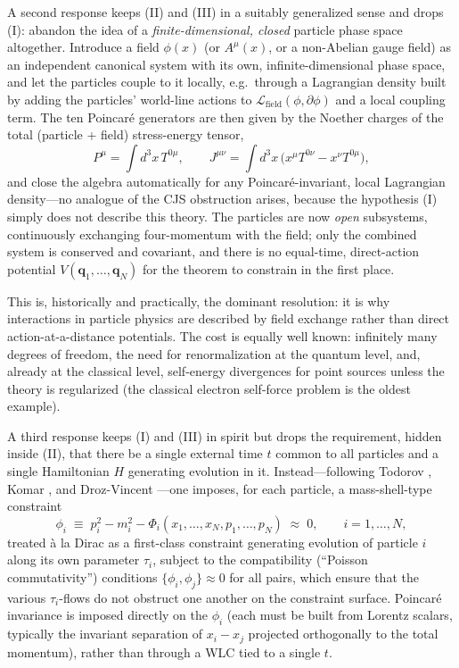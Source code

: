 A second response keeps (II) and (III) in a suitably generalized sense and
drops (I): abandon the idea of a \emph{finite-dimensional, closed} particle
phase space altogether. Introduce a field $\phi(x)$ (or $A^\mu(x)$, or a
non-Abelian gauge field) as an independent canonical system with its own,
infinite-dimensional phase space, and let the particles couple to it locally,
e.g.\ through a Lagrangian density built by adding the particles' world-line
actions to $\mathcal L_{\text{field}}(\phi,\partial\phi)$ and a local coupling
term. The ten Poincar\'e generators are then given by the Noether charges of
the total (particle + field) stress-energy tensor,
\begin{equation}
P^\mu=\int d^3x\, T^{0\mu}, \qquad J^{\mu\nu}=
    \int d^3x\,\big(x^\mu T^{0\nu}-x^\nu T^{0\mu}\big),
\end{equation}
and close the algebra automatically for any Poincar\'e-invariant, local
Lagrangian density---no analogue of the CJS obstruction arises, because the
hypothesis (I) simply does not describe this theory. The particles are now
\emph{open} subsystems, continuously exchanging four-momentum with the field;
only the combined system is conserved and covariant, and there is no
equal-time, direct-action potential $V({\bm q}_1,\dots,{\bm q}_N)$ for the
theorem to constrain in the first place.

This is, historically and practically, the dominant resolution: it is why
interactions in particle physics are described by field exchange rather than
direct action-at-a-distance potentials. The cost is equally well known:
infinitely many degrees of freedom, the need for renormalization at the quantum
level, and, already at the classical level, self-energy divergences for point
sources unless the theory is regularized (the classical electron self-force
problem is the oldest example).

A third response keeps (I) and (III) in spirit but drops the requirement,
hidden inside (II), that there be a single external time $t$ common to all
particles and a single Hamiltonian $H$ generating evolution in it.
Instead---following Todorov , Komar , and Droz-Vincent ---one imposes, for each
particle, a mass-shell-type constraint
\begin{equation}
\phi_i \;\equiv\; p_i^2 - m_i^2 - \Phi_i(x_1,\dots,x_N,p_1,\dots,p_N) \;\approx\;
    0, \qquad i=1,\dots,N,
\label{eq:constraint}
\end{equation}
treated \`a la Dirac as a first-class constraint generating evolution of
particle $i$ along its own parameter $\tau_i$, subject to the compatibility
(``Poisson commutativity'') conditions $\{\phi_i,\phi_j\}\approx 0$ for all
pairs, which ensure that the various $\tau_i$-flows do not obstruct one another
on the constraint surface. Poincar\'e invariance is imposed directly on the
$\phi_i$ (each must be built from Lorentz scalars, typically the invariant
separation of $x_i-x_j$ projected orthogonally to the total momentum), rather
than through a WLC tied to a single $t$.

